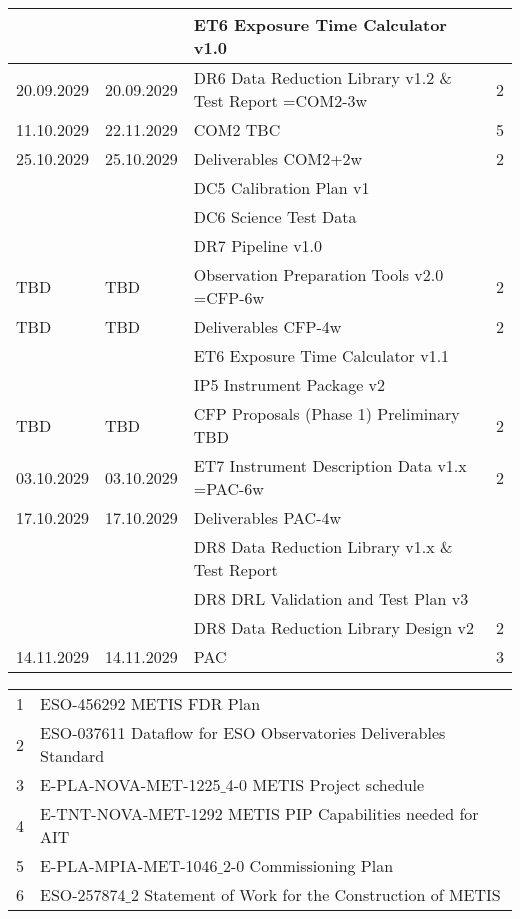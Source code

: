 \begin{table}[h!]
\begin{tabularx}{\textwidth}{llll}
    &		   & ET6 Exposure Time Calculator v1.0                          &	\\
\hline
20.09.2029 & 20.09.2029 & DR6 Data Reduction Library v1.2 \& Test Report =COM2-3w	    &	2 \\
\hline
11.10.2029 & 22.11.2029 & COM2 TBC						                    & 5 \\
\hline
25.10.2029 & 25.10.2029 & Deliverables COM2+2w                              & 2 \\
   &           & DC5 Calibration Plan v1					                 &	\\
   &           & DC6 Science Test Data                                      &	\\
   &		    & DR7 Pipeline v1.0					                         &	\\
\hline
TBD    & TBD   & Observation Preparation Tools v2.0  =CFP-6w     	        & 2 \\
\hline
TBD	   & TBD   & Deliverables CFP-4w                                        & 2 \\
   &           & ET6 Exposure Time Calculator v1.1			                 &	\\
   &		    & IP5 Instrument Package v2				                     &	\\
\hline
TBD	   & TBD   & CFP Proposals (Phase 1) Preliminary  TBD		           & 2 \\
\hline
03.10.2029 & 03.10.2029 & ET7 Instrument Description Data v1.x =PAC-6w	   & 2 \\
\hline
17.10.2029 & 17.10.2029 & Deliverables PAC-4w                              &	\\
   &           & DR8 Data Reduction Library v1.x \& Test Report            &	\\
   &           & DR8 DRL Validation and Test Plan v3                       &	\\
   &           & DR8 Data Reduction Library Design v2			            & 2 \\
\hline
14.11.2029 & 14.11.2029 & PAC							                   & 3 \\
\hline\hline
\end{tabularx}			
\tiny
\begin{tabularx}{\textwidth}{ll}
1 & ESO-456292 METIS FDR Plan  \\
2 & ESO-037611 Dataflow for ESO Observatories Deliverables Standard \\
3 & E-PLA-NOVA-MET-1225$\_$4-0 METIS Project schedule \\
4 & E-TNT-NOVA-MET-1292 METIS PIP Capabilities needed for AIT \\ 
5 & E-PLA-MPIA-MET-1046$\_$2-0 Commissioning Plan \\
6 & ESO-257874$\_$2 Statement of Work for the Construction of METIS \\
\end{tabularx} 
\end{table}



